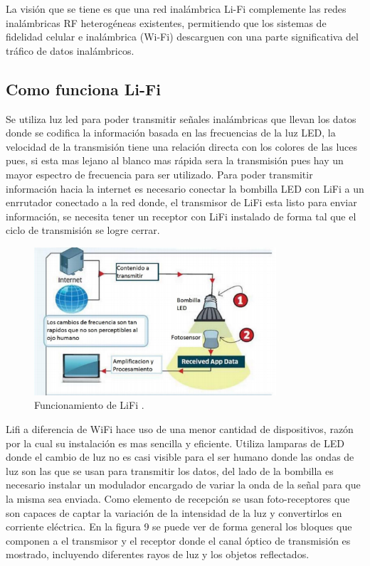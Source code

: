 \documentclass[10pt,journal,compsoc]{IEEEtran}
\begin{document}
La visión que se tiene es que una red inalámbrica Li-Fi complemente las redes inalámbricas RF heterogéneas existentes, permitiendo que los sistemas de fidelidad celular e inalámbrica (Wi-Fi) descarguen con  una parte significativa del tráfico de datos inalámbricos.

\subsection{Como funciona Li-Fi}

Se utiliza luz led para poder transmitir señales inalámbricas que llevan los datos donde se codifica la información basada en las frecuencias de la luz LED, la velocidad de la transmisión tiene una relación directa con los colores de las luces pues, si esta mas lejano al blanco mas rápida sera la transmisión pues hay un mayor espectro de frecuencia para ser utilizado. Para poder transmitir información hacia la internet es necesario conectar la bombilla LED con LiFi a un enrrutador conectado a la red donde, el transmisor de LiFi esta listo para enviar información, se necesita tener un receptor con LiFi instalado de forma tal que el ciclo de transmisión se logre cerrar. 

\begin{figure}[h]
    \centering
    \includegraphics[width=9cm]{lifi1}
    \caption{Funcionamiento de LiFi \cite{aravena}.}
    \label{fig:base-station}
\end{figure}


Lifi a diferencia de WiFi hace uso de una menor cantidad de dispositivos, razón por la cual su instalación es mas sencilla y eficiente. Utiliza lamparas de LED donde el cambio de luz no es casi visible para el ser humano donde las ondas de luz son las que se usan para transmitir los datos, del lado de la bombilla es necesario instalar un modulador encargado de variar la onda de la señal para que la misma sea enviada. Como elemento de recepción se usan foto-receptores que son capaces de captar la variación de la intensidad de la luz y convertirlos en corriente eléctrica. En la figura 9 se puede ver de forma general los bloques que componen a el transmisor y el receptor donde el canal óptico de transmisión es mostrado, incluyendo diferentes rayos de luz y los objetos reflectados.
\end{document}
